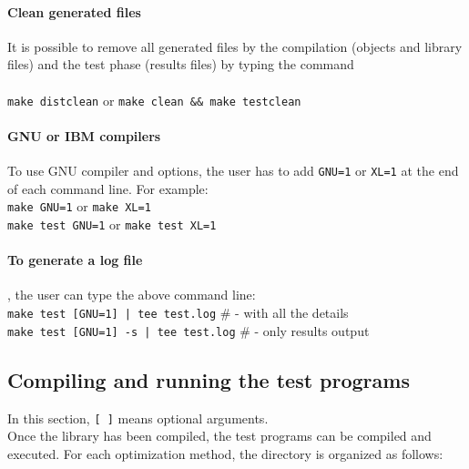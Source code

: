 \documentclass[a4paper,twoside,final,onecolumn,11pt,openright]{article}
\begin{document}
\paragraph{Clean generated files} It is possible to remove all generated files by the compilation (objects and library files) and the test phase (results files) by typing the command
\\
\\
\texttt{make distclean} \hspace{1cm} or \hspace{1cm} \texttt{make clean \&\& make testclean}

\paragraph{GNU or IBM compilers}To use GNU compiler and options, the user has to add \texttt{GNU=1} or \texttt{XL=1} at the end of each command line. For example:\\
\texttt{make GNU=1} or \texttt{make XL=1}\\
\texttt{make test GNU=1} or \texttt{make test XL=1}

\paragraph{To generate a log file}, the user can type the above command line:\\
\texttt{make test [GNU=1] | tee test.log}  \hspace{2em}  \# - with all the details\\
\texttt{make test [GNU=1] -s | tee test.log}\hspace{1em}  \# - only results output


\subsection{Compiling and running the test programs}
In this section, \texttt{[ ]}  means optional arguments.\\

Once the library has been compiled, the test programs can be compiled and executed. For each optimization method, the directory is organized as follows:

\end{document}

